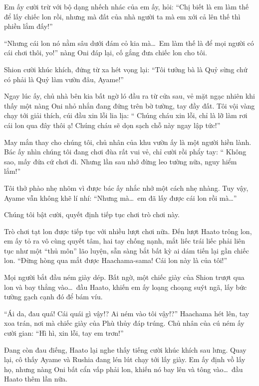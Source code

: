 \documentclass[../main.tex]{subfiles}
\begin{document}
Em ấy cười trừ với bộ dạng nhếch nhác của em ấy, hỏi: ``Chị biết là em làm thế để lấy chiếc lon rồi, nhưng mà đất của nhà người ta mà em xới cả lên thế thì phiền lắm đấy!''

``Nhưng cái lon nó nằm sâu dưới đám cỏ kia mà\dots\ Em làm thế là để mọi người có cái chơi thôi, yo!'' nàng Oni đáp lại, cố gắng đưa chiếc lon cho tôi.

Shion cười khúc khích, đứng từ xa hét vọng lại: ``Tôi tưởng bà là Quỷ sừng chứ có phải là Quỷ làm vườn đâu, Ayame!''

Ngay lúc ấy, chủ nhà bên kia bất ngờ ló đầu ra từ cửa sau, vẻ mặt ngạc nhiên khi thấy một nàng Oni nhỏ nhắn đang đứng trên bờ tường, tay đầy đất. Tôi vội vàng chạy tới giải thích, cúi đầu xin lỗi lia lịa: ``{\color{red} Chúng cháu xin lỗi, chỉ là lỡ làm rơi cái lon qua đây thôi ạ! Chúng cháu sẽ dọn sạch chỗ này ngay lập tức!}''

May mắn thay cho chúng tôi, chủ nhân của khu vườn ấy là một người hiền lành. Bác ấy nhìn chúng tôi đang chơi đùa rất vui vẻ, chỉ cười rồi phẩy tay: ``{\color{red} Không sao, mấy đứa cứ chơi đi. Nhưng lần sau nhớ đừng leo tường nữa, nguy hiểm lắm!}''

Tôi thở phào nhẹ nhõm vì được bác ấy nhắc nhở một cách nhẹ nhàng. Tuy vậy, Ayame vẫn không khẽ lí nhí: ``Nhưng mà\dots\ em đã lấy được cái lon rồi mà\dots''

Chúng tôi bật cười, quyết định tiếp tục chơi trò chơi này.

\ct

Trò chơi tạt lon được tiếp tục với nhiều lượt chơi nữa. Đến lượt Haato trông lon, em ấy tỏ ra vô cùng quyết tâm, hai tay chống nạnh, mắt liếc trái liếc phải liên tục như một ``thủ môn'' lão luyện, sẵn sàng bắt bất kỳ ai dám tiến lại gần chiếc lon. ``Đừng hòng qua mắt được Haachama-sama! Cái lon này là của tôi!''

Mọi người bắt đầu ném giày dép. Bất ngờ, một chiếc giày của Shion trượt qua lon và bay thẳng vào\dots\ đầu Haato, khiến em ấy loạng choạng suýt ngã, lấy bức tường gạch cạnh đó để bám víu.

``Ái da, đau quá! Cái quái gì vậy!? Ai ném vào tôi vậy!?'' Haachama hét lên, tay xoa trán, nơi mà chiếc giày của Phù thủy đáp trúng. Chủ nhân của cú ném ấy cười gian: ``Hì hì, xin lỗi, tay em trơn!''

Đang còn đau điếng, Haato lại nghe thấy tiếng cười khúc khích sau lưng. Quay lại, cô thấy Ayame và Rushia đang lén lút chạy tới lấy giày. Em ấy định vồ lấy họ, nhưng nàng Oni bất cẩn vấp phải lon, khiến nó bay lên và tông vào\dots\ đầu Haato thêm lần nữa.
\end{document}
